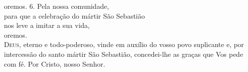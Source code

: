 \documentclass{book}
\begin{document}
oremos.
\vspace{.1cm}
\newline
{\color{VioletRed1} 6.} Pela nossa comunidade,\\
para que  a celebração do mártir São Sebastião\\
nos leve a imitar a sua vida,\\
oremos.
\vspace{.1cm} \\
\lettrine[findent=2pt]{\color{VioletRed1}D}{eus}, eterno e todo-poderoso,
\newline
vinde em auxílio do vosso povo suplicante
\newline
e, por intercessão do santo mártir São Sebastião,
\newline
concedei-lhe as graças que Vos pede com fé.
\newline
Por Cristo, nosso Senhor.
\newline
{}
\end{document}
